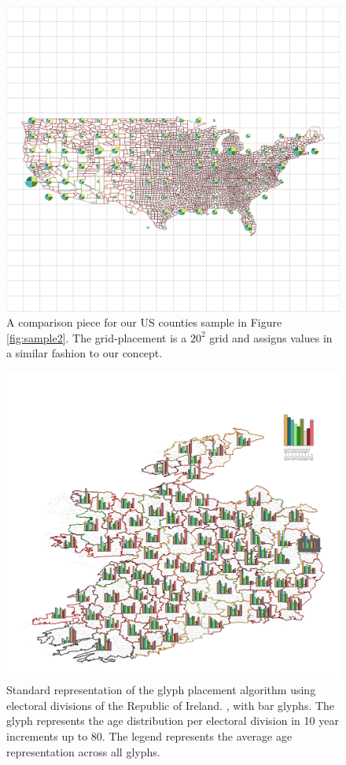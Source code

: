 \begin{figure} \centering
\includegraphics[width=1\textwidth]{images/ch5/USgridBFull2.png}
\caption{A comparison piece for our US counties sample in Figure \ref{fig:sample2}. The grid-placement is a $20^2$ grid and assigns values in a similar fashion to our concept.}
\end{figure}
\begin{figure} \centering
\includegraphics[width=1\textwidth]{images/ch5/irelandgridAFull.png}
\caption{Standard representation of the glyph placement algorithm using electoral divisions of the Republic of Ireland. \cite{electoralDivisions}, with bar glyphs. The glyph represents the age distribution per electoral division in 10 year increments up to 80. The legend represents the average age representation across all glyphs. } \label{fig:sample3}
\end{figure}
